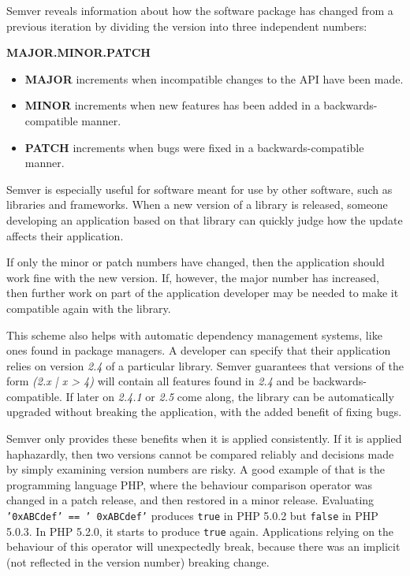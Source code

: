 \documentclass{l4proj}
\begin{document}
Semver reveals information about how the software package has changed
from a previous iteration by dividing the version into three
independent numbers:
\begin{center}
\textbf{MAJOR.MINOR.PATCH}
\end{center}

\begin{itemize}
\item \textbf{MAJOR} increments when incompatible changes to the API
have been made.
\item \textbf{MINOR} increments when new features has been added in a
backwards-compatible manner.
\item \textbf{PATCH} increments when bugs were fixed in a
backwards-compatible manner.
\end{itemize}

Semver is especially useful for software meant for use by other
software, such as libraries and frameworks. When a new version of a
library is released, someone developing an application based on that
library can quickly judge how the update affects their application.

If only the minor or patch numbers have changed, then the application
should work fine with the new version. If, however, the major number
has increased, then further work on part of the application developer
may be needed to make it compatible again with the library.

This scheme also helps with automatic dependency management systems,
like ones found in package managers. A developer can specify that
their application relies on version \textit{2.4} of a particular
library. Semver guarantees that versions of the form \textit{(2.x | x
 > 4)} will contain all features found in \textit{2.4} and be backwards-compatible.
If later on \textit{2.4.1} or \textit{2.5} come along, the
library can be automatically upgraded without breaking the
application, with the added benefit of fixing bugs.

Semver only provides these benefits when it is applied consistently.
If it is applied haphazardly, then two versions cannot be compared
reliably and decisions made by simply examining version numbers are
risky. A good example of that is the programming language PHP, where
the behaviour comparison operator was changed in a patch release, and
then restored in a minor release. Evaluating \texttt{'0xABCdef' == '
0xABCdef'} produces \texttt{true} in PHP 5.0.2 but \texttt{false} in
PHP 5.0.3. In PHP 5.2.0, it starts to produce \texttt{true} again.
Applications relying on the behaviour of this operator will unexpectedly
break, because there was an implicit (not reflected in the version number)
breaking change.
\end{document}
